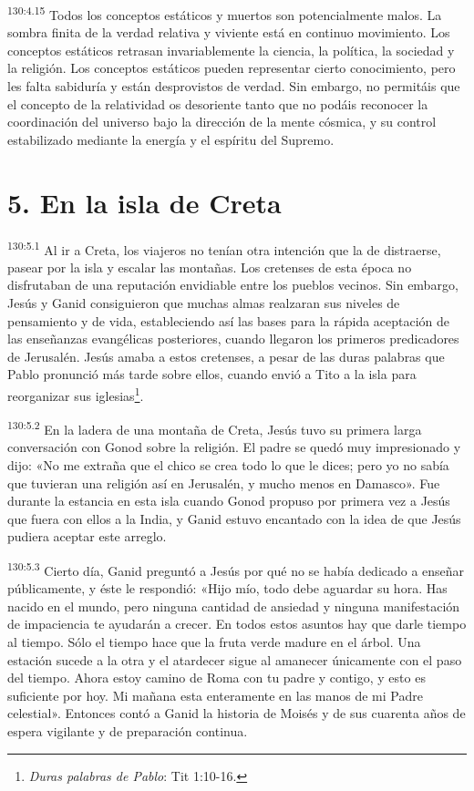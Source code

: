 \par
\textsuperscript{130:4.15} Todos los conceptos estáticos y muertos son potencialmente malos. La sombra finita de la verdad relativa y viviente está en continuo movimiento. Los conceptos estáticos retrasan invariablemente la ciencia, la política, la sociedad y la religión. Los conceptos estáticos pueden representar cierto conocimiento, pero les falta sabiduría y están desprovistos de verdad. Sin embargo, no permitáis que el concepto de la relatividad os desoriente tanto que no podáis reconocer la coordinación del universo bajo la dirección de la mente cósmica, y su control estabilizado mediante la energía y el espíritu del Supremo.

\section*{5. En la isla de Creta}
\par
\textsuperscript{130:5.1} Al ir a Creta, los viajeros no tenían otra intención que la de distraerse, pasear por la isla y escalar las montañas. Los cretenses de esta época no disfrutaban de una reputación envidiable entre los pueblos vecinos. Sin embargo, Jesús y Ganid consiguieron que muchas almas realzaran sus niveles de pensamiento y de vida, estableciendo así las bases para la rápida aceptación de las enseñanzas evangélicas posteriores, cuando llegaron los primeros predicadores de Jerusalén. Jesús amaba a estos cretenses, a pesar de las duras palabras que Pablo pronunció más tarde sobre ellos, cuando envió a Tito a la isla para reorganizar sus iglesias\footnote{\textit{Duras palabras de Pablo}: Tit 1:10-16.}.

\par
\textsuperscript{130:5.2} En la ladera de una montaña de Creta, Jesús tuvo su primera larga conversación con Gonod sobre la religión. El padre se quedó muy impresionado y dijo: «No me extraña que el chico se crea todo lo que le dices; pero yo no sabía que tuvieran una religión así en Jerusalén, y mucho menos en Damasco». Fue durante la estancia en esta isla cuando Gonod propuso por primera vez a Jesús que fuera con ellos a la India, y Ganid estuvo encantado con la idea de que Jesús pudiera aceptar este arreglo.

\par
\textsuperscript{130:5.3} Cierto día, Ganid preguntó a Jesús por qué no se había dedicado a enseñar públicamente, y éste le respondió: «Hijo mío, todo debe aguardar su hora. Has nacido en el mundo, pero ninguna cantidad de ansiedad y ninguna manifestación de impaciencia te ayudarán a crecer. En todos estos asuntos hay que darle tiempo al tiempo. Sólo el tiempo hace que la fruta verde madure en el árbol. Una estación sucede a la otra y el atardecer sigue al amanecer únicamente con el paso del tiempo. Ahora estoy camino de Roma con tu padre y contigo, y esto es suficiente por hoy. Mi mañana esta enteramente en las manos de mi Padre celestial». Entonces contó a Ganid la historia de Moisés y de sus cuarenta años de espera vigilante y de preparación continua.

